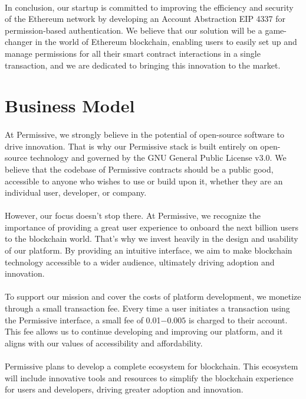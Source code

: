\documentclass{article}
\begin{document}
\paragraph{}
In conclusion, our startup is committed to improving the efficiency and security of the Ethereum network by developing an Account Abstraction EIP 4337 for permission-based authentication. We believe that our solution will be a game-changer in the world of Ethereum blockchain, enabling users to easily set up and manage permissions for all their smart contract interactions in a single transaction, and we are dedicated to bringing this innovation to the market.
\section{Business Model}
\paragraph{}
At Permissive, we strongly believe in the potential of open-source software to drive innovation. That is why our Permissive stack is built entirely on open-source technology and governed by the GNU General Public License v3.0. We believe that the codebase of Permissive contracts should be a public good, accessible to anyone who wishes to use or build upon it, whether they are an individual user, developer, or company.
\paragraph{}
However, our focus doesn't stop there. At Permissive, we recognize the importance of providing a great user experience to onboard the next billion users to the blockchain world. That's why we invest heavily in the design and usability of our platform. By providing an intuitive interface, we aim to make blockchain technology accessible to a wider audience, ultimately driving adoption and innovation.
\paragraph{}
To support our mission and cover the costs of platform development, we monetize through a small transaction fee. Every time a user initiates a transaction using the Permissive interface, a small fee of 0.01$-0.005$ is charged to their account. This fee allows us to continue developing and improving our platform, and it aligns with our values of accessibility and affordability.
\paragraph{}
Permissive plans to develop a complete ecosystem for blockchain. This ecosystem will include innovative tools and resources to simplify the blockchain experience for users and developers, driving greater adoption and innovation.
\end{document}
